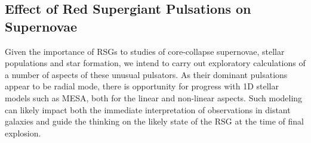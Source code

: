 \subsection{Effect of Red Supergiant Pulsations on Supernovae}

Given the importance of RSGs to studies of core-collapse supernovae, stellar populations and star formation, we intend to carry out exploratory calculations of a number of aspects of these unusual pulsators. As their dominant pulsations appear to be  radial mode, there is opportunity for progress with 1D stellar models such as MESA, both for the linear and non-linear aspects. Such modeling can likely impact both the immediate interpretation of observations in distant galaxies and guide the thinking on the likely state of the RSG at the time of final explosion. 